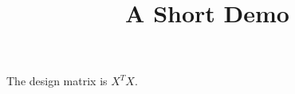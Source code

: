\documentclass[article]{jss}
\title{A Short Demo}
\begin{document}
The design matrix is $X^T X$.
\end{document}
